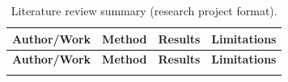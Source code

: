 \documentclass{FastFyp}
\begin{document}
{\small
{}
\setlength{\tabcolsep}{4pt}
\renewcommand{\arraystretch}{1.08}
\setlength{\LTpre}{0.5\baselineskip}
\setlength{\LTpost}{0.5\baselineskip}
\begin{longtable}{|>{\raggedright\arraybackslash}p{2.35cm}|>{\raggedright\arraybackslash}p{4.15cm}|>{\raggedright\arraybackslash}p{4.25cm}|>{\raggedright\arraybackslash}p{\dimexpr\textwidth-10.75cm-8\tabcolsep-5\arrayrulewidth\relax}|}
\caption{Literature review summary (research project format).}
\label{tab:lr_summary}\\
\hline
\textbf{Author/Work} & \textbf{Method} & \textbf{Results} & \textbf{Limitations} \\
\hline
\endfirsthead
\hline
\textbf{Author/Work} & \textbf{Method} & \textbf{Results} & \textbf{Limitations} \\
\hline
\endhead
\hline
\endlastfoot


\end{longtable}}
\end{document}
